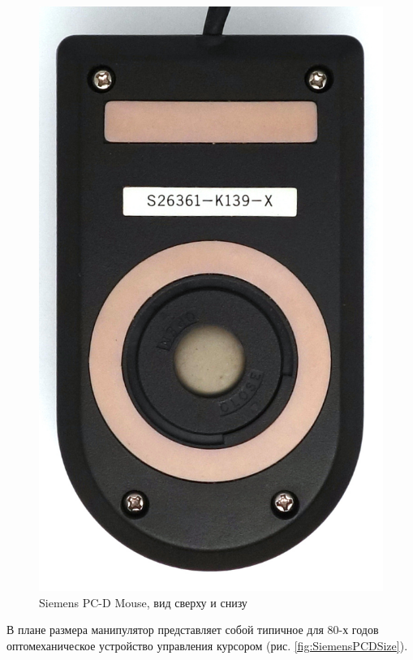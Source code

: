 \documentclass[11pt, a4paper]{article}
\begin{document}
\begin{figure}[h]
    \includegraphics[scale=0.45]{1985_siemens_pcd_mouse/bottom_30.jpg}
    \caption{Siemens PC-D Mouse, вид сверху и снизу}
    \label{fig:SiemensPCDTopBottom}
\end{figure}

В плане размера манипулятор представляет собой типичное для 80-х годов оптомеханическое устройство управления курсором (рис. \ref{fig:SiemensPCDSize}).
\end{document}
